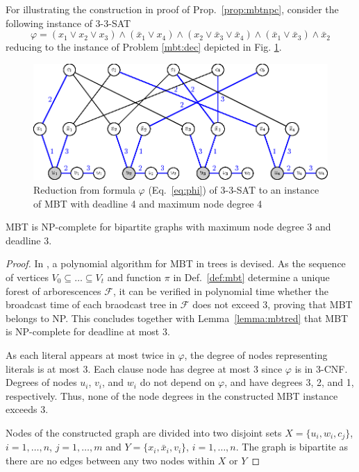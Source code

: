 For illustrating the construction in proof of Prop.~\ref{prop:mbtnpc}, consider the following instance of \textsc{3-3-SAT}
\begin{equation}
\varphi=(x_1\vee x_2\vee x_3)\wedge(\bar{x}_1\vee x_4)\wedge(x_2\vee \bar{x}_3 \vee\bar{x}_4)\wedge(\bar{x}_1\vee \bar{x}_3)\wedge \bar{x}_2 
\label{eq:phi}
\end{equation}
reducing to the instance of Problem \ref{mbt:dec} depicted in Fig. \ref{fig:mbtnpc}.
\begin{figure}
\centering
\includegraphics{figurer/mbtnpc.eps}
\caption{Reduction from formula $\varphi$ (Eq.~\eqref{eq:phi}) of \textsc{3-3-SAT} to an instance of MBT with deadline 4 and maximum node degree 4}
\label{fig:mbtnpc}
\end{figure}

\begin{proposition}
MBT is NP-complete for bipartite graphs with maximum node degree 3 and deadline 3.
\end{proposition}
\begin{proof}
In \cite{slater81}, a polynomial algorithm for MBT in trees is devised.
As the sequence of vertices $V_0\subseteq\dots\subseteq V_t$ and function $\pi$ in Def.~\ref{def:mbt} determine a unique forest of arborescences $\mathcal{F}$,
it can be verified in polynomial time whether the broadcast time of each braodcast tree in $\mathcal{F}$ does not exceed 3, proving that MBT belongs to NP.
This concludes together with Lemma~\ref{lemma:mbtred} that MBT is NP-complete for deadline at most 3.

As each literal appears at most twice in $\varphi$, the degree of nodes representing literals is at most 3. 
Each clause node has degree at most 3 since $\varphi$ is in 3-CNF.
Degrees of nodes $u_i$, $v_i$, and $w_i$ do not depend on $\varphi$, and have degrees 3, 2, and 1, respectively.
Thus, none of the node degrees in the constructed MBT instance exceeds 3.

Nodes of the constructed graph are divided into two disjoint sets $X=\{u_i,w_i,c_j\}$, $i=1,\dots,n$, $j=1,\dots,m$ and $Y=\{x_i,\bar{x}_i,v_i\}$, $i=1,\dots,n$.
The graph is bipartite as there are no edges between any two nodes within $X$ or $Y$
\end{proof}

